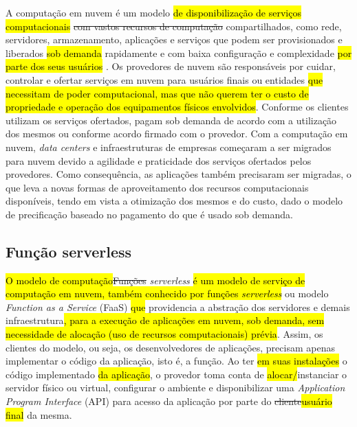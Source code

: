 \documentclass[10pt,conference]{IEEEtran}
\begin{document}
A computação em nuvem é um modelo \hl{de disponibilização de serviços computacionais} \st{com vastos recursos de computação} compartilhados, como rede, servidores, armazenamento, aplicações e serviços que podem ser provisionados e liberados \hl{sob demanda} rapidamente e com baixa configuração e complexidade \hl{por parte dos seus usuários} \cite{nist_2011_cloud_computing}.
Os provedores de nuvem são responsáveis por cuidar, controlar e ofertar serviços em nuvem para usuários finais ou entidades \hl{que necessitam de poder computacional, mas que não querem ter o custo de propriedade e operação dos equipamentos físicos envolvidos}. Conforme os clientes utilizam os serviços ofertados, pagam sob demanda de acordo com a utilização dos mesmos ou conforme acordo firmado com o provedor. Com a computação em nuvem, \textit{data centers} e infraestruturas de empresas começaram a ser migrados para nuvem devido a agilidade e praticidade dos serviços ofertados pelos provedores. Como consequência, as aplicações também precisaram ser migradas, o que leva a novas formas de aproveitamento dos recursos computacionais disponíveis, tendo em vista a otimização dos mesmos e do custo, dado o modelo de precificação baseado no pagamento do que é usado sob demanda.

\subsection{Função serverless}
\label{subsec:serverless_funcion}

\hl{O modelo de computação}\st{Funções} \textit{serverless} \hl{é um modelo de serviço de computação em nuvem, também conhecido por funções \textit{serverless}} ou modelo \textit{Function as a Service} (FaaS) \hl{que} providencia a abstração dos servidores e demais infraestrutura\hl{, para a execução de aplicações em nuvem, sob demanda, sem necessidade de alocação (uso de recursos computacionais) prévia}. Assim, os clientes do modelo, ou seja, os desenvolvedores de aplicações, precisam apenas implementar o código da aplicação, isto é, a função. Ao ter \hl{em suas instalações} o código implementado \hl{da aplicação}, o provedor toma conta de \hl{alocar/}instanciar o servidor físico ou virtual, configurar o ambiente e disponibilizar uma \textit{Application Program Interface} (API) para acesso da aplicação por parte do \st{cliente}\hl{usuário final} da mesma. 
\end{document}
